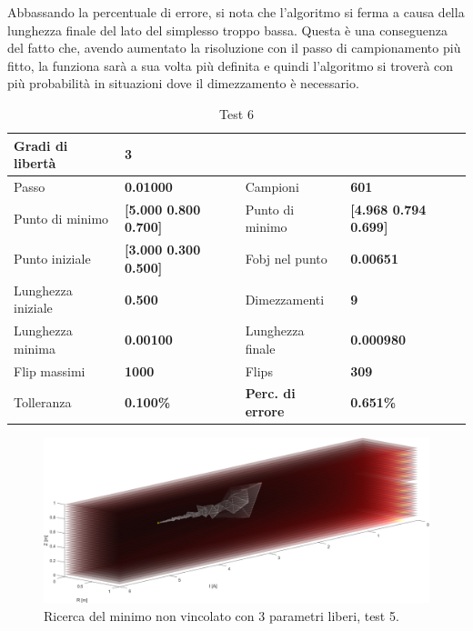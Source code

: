 \documentclass[a4paper, 11pt]{article}
\begin{document}
\noindent
Abbassando la percentuale di errore, si nota che l'algoritmo si ferma a causa
della lunghezza finale del lato del simplesso troppo bassa. Questa è una
conseguenza del fatto che, avendo aumentato la risoluzione con il passo di
campionamento più fitto, la funziona sarà a sua volta più definita e quindi
l'algoritmo si troverà con più probabilità in situazioni dove il dimezzamento è
necessario.

\begin{table}[h] 
    \caption{Test 6}
    \begin{center}
    \begin{tabular}{|l|l|l|l|} 
    \hline 
Gradi di libertà & \textbf{3} &  &  \\ \hline 
Passo & \textbf{0.01000} & Campioni & \textbf{601} \\ \hline 
Punto di minimo & \textbf{{[}5.000 0.800 0.700{]}} & Punto di minimo &
\textbf{{[}4.968 0.794 0.699{]}} \\ \hline 
Punto iniziale & \textbf{{[}3.000 0.300 0.500{]}} & Fobj nel punto &
\textbf{0.00651} \\ \hline 
Lunghezza iniziale & \textbf{0.500} & Dimezzamenti & \textbf{9} \\ \hline 
Lunghezza minima & \textbf{0.00100} & Lunghezza finale & \textbf{0.000980} \\
\hline
Flip massimi & \textbf{1000} & Flips & \textbf{309} \\ \hline 
Tolleranza & \textbf{0.100\%} & \textbf{Perc. di errore} & \textbf{0.651\%} \\
\hline 
    \end{tabular}
    \end{center}
    \end{table}

\begin{figure}[H]
    \centering
        \includegraphics[width=16cm]{assets/figure4}
        \caption{Ricerca del minimo non vincolato con 3 parametri liberi, test 5.}
\end{figure}
\noindent 
\end{document}
